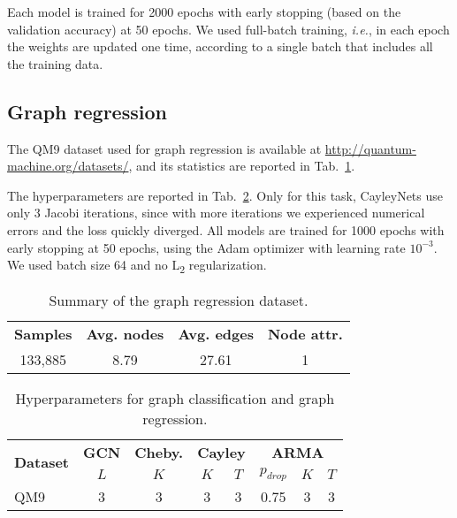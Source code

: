 \documentclass{article}
\begin{document}
Each model is trained for 2000 epochs with early stopping (based on the validation accuracy) at 50 epochs.
We used full-batch training, \emph{i.e.}, in each epoch the weights are updated one time, according to a single batch that includes all the training data. 

\subsection{Graph regression}

The QM9 dataset used for graph regression is available at \url{http://quantum-machine.org/datasets/}, and its statistics are reported in Tab.~\ref{tab:gr_dataset}.

The hyperparameters are reported in Tab.~\ref{tab:hyper_gr}. 
Only for this task, CayleyNets use only 3 Jacobi iterations, since with more iterations we experienced numerical errors and the loss quickly diverged.
All models are trained for 1000 epochs with early stopping at 50 epochs, using the Adam optimizer with learning rate $10^{-3}$. 
We used batch size 64 and no L\textsubscript{2} regularization.

\bgroup
\def\arraystretch{1.0} \setlength\tabcolsep{.8em} \begin{table}[!ht]
\small
\centering
\caption{Summary of the graph regression dataset.} 
\label{tab:gr_dataset}
\begin{tabular}{cccc}
\cmidrule[1.5pt]{1-4}
\textbf{Samples} & \textbf{Avg. nodes} & \textbf{Avg. edges} & \textbf{Node attr.} \\
\cmidrule[.5pt]{1-4}
133,885 & 8.79 & 27.61 & 1 \\
\cmidrule[1.5pt]{1-4}
\end{tabular}
\end{table}
\egroup

\begin{table}[!ht]
\setlength\tabcolsep{.5em} \small
\centering
\caption{Hyperparameters for graph classification and graph regression.}
\bgroup
\def\arraystretch{1.0} \begin{tabular}{l|c|c|cc|ccc}
\cmidrule[1.5pt]{1-8}
\multirow{ 2}{*}{\textbf{Dataset}} & \textbf{GCN} & \textbf{Cheby.} & \multicolumn{2}{c|}{\textbf{Cayley}} & \multicolumn{3}{c}{\textbf{ARMA}} \\
                                   & $L$ & $K$ & $K$ & $T$ & $p_{drop}$ & $K$ & $T$ \\
\midrule
QM9      & 3 & 3 & 3 & 3 & 0.75 & 3 & 3 \\
\cmidrule[1.5pt]{1-8}
\end{tabular}
\label{tab:hyper_gr}
\egroup
\end{table}
\end{document}

